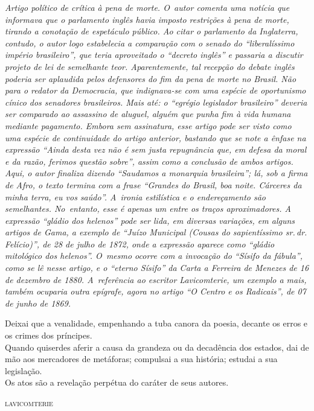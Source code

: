 \begin{didascalia}\itshape
Artigo político de crítica à pena de morte. O~autor comenta uma notícia
que informava que o parlamento inglês havia imposto restrições à pena de
morte, tirando a conotação de espetáculo público. Ao citar o parlamento
da Inglaterra, contudo, o autor logo estabelecia a comparação com o
senado do ``liberalíssimo império brasileiro'', que teria aproveitado o
``decreto inglês'' e passaria a discutir projeto de lei de semelhante
teor. Aparentemente, tal recepção do debate inglês poderia ser aplaudida
pelos defensores do fim da pena de morte no Brasil. Não para o redator
da \textnormal{Democracia}, que indignava-se com uma espécie de oportunismo
cínico dos senadores brasileiros. Mais até: o ``egrégio legislador
brasileiro'' deveria ser comparado ao assassino de aluguel, alguém que
punha fim à vida humana mediante pagamento. Embora sem assinatura, esse
artigo pode ser visto como uma espécie de continuidade do artigo
anterior, bastando que se note a ênfase na
expressão ``Ainda desta vez não é sem justa repugnância que, em defesa da
moral e da razão, ferimos questão sobre'', assim como a conclusão de
ambos artigos. Aqui, o autor finaliza dizendo ``Saudamos a monarquia
brasileira''; lá, sob a firma de Afro, o texto termina com a frase
``Grandes do Brasil, boa noite. Cárceres da minha terra, eu vos saúdo''.
A~ironia estilística e o endereçamento são semelhantes. No~entanto, esse é
apenas um entre os traços aproximadores. A expressão ``gládio dos
helenos'' pode ser lida, em diversas variações, em alguns artigos de
Gama, a exemplo de ``Juízo Municipal (Cousas do sapientíssimo sr.\,dr.\,Felício)'', de 28 de julho de 1872, onde a expressão aparece como ``gládio
mitológico dos helenos''. O~mesmo ocorre com a invocação do ``Sísifo da
fábula'', como se lê nesse artigo, e o ``eterno Sísifo'' da Carta a
Ferreira de Menezes de 16 de dezembro de 1880. A~referência ao escritor
Lavicomterie, um exemplo a mais, também ocuparia outra epígrafe, agora
no artigo ``O Centro e os Radicais'', de 07 de junho de 1869.
\end{didascalia}



\epigraph{Deixai que a venalidade, empenhando a tuba\footnotemark{} canora\footnotemark{} da
poesia, decante os erros e os crimes dos príncipes.\\
Quando quiserdes aferir a causa da grandeza ou da decadência dos
estados, dai de mão aos mercadores de metáforas; compulsai\footnotemark{} a sua história; estudai a sua legislação.\\
Os atos são a revelação perpétua do caráter de seus autores.}{\textsc{lavicomterie}\footnotemark}


